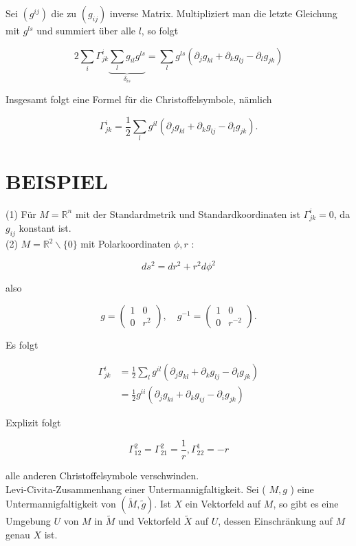 \documentclass[10pt, letterpaper]{article}
\begin{document}
Sei $\left(g^{i j}\right)$ die zu $\left(g_{i j}\right)$ inverse Matrix. Multipliziert man die letzte Gleichung mit $g^{l s}$ und summiert über alle $l$, so folgt

$$
2 \sum_{i} \Gamma_{j k}^{i} \underbrace{\sum_{l} g_{i l} g^{l s}}_{\delta_{i s}}=\sum_{l} g^{l s}\left(\partial_{j} g_{k l}+\partial_{k} g_{l j}-\partial_{l} g_{j k}\right)
$$

Insgesamt folgt eine Formel für die Christoffelsymbole, nämlich

$$
\Gamma_{j k}^{i}=\frac{1}{2} \sum_{l} g^{i l}\left(\partial_{j} g_{k l}+\partial_{k} g_{l j}-\partial_{l} g_{j k}\right) .
$$

\section*{BEISPIEL}
(1) Für $M=\mathbb{R}^{n}$ mit der Standardmetrik und Standardkoordinaten ist $\Gamma_{j k}^{i}=0$, da $g_{i j}$ konstant ist.\\
(2) $M=\mathbb{R}^{2} \backslash\{0\}$ mit Polarkoordinaten $\phi, r$ :

$$
d s^{2}=d r^{2}+r^{2} d \phi^{2}
$$

also

$$
g=\left(\begin{array}{cc}
1 & 0 \\
0 & r^{2}
\end{array}\right), \quad g^{-1}=\left(\begin{array}{cc}
1 & 0 \\
0 & r^{-2}
\end{array}\right) .
$$

Es folgt

$$
\begin{aligned}
\Gamma_{j k}^{i} & =\frac{1}{2} \sum_{l} g^{i l}\left(\partial_{j} g_{k l}+\partial_{k} g_{l j}-\partial_{l} g_{j k}\right) \\
& =\frac{1}{2} g^{i i}\left(\partial_{j} g_{k i}+\partial_{k} g_{i j}-\partial_{i} g_{j k}\right)
\end{aligned}
$$

Explizit folgt

$$
\Gamma_{12}^{2}=\Gamma_{21}^{2}=\frac{1}{r}, \Gamma_{22}^{1}=-r
$$

alle anderen Christoffelsymbole verschwinden.\\
Levi-Civita-Zusammenhang einer Untermannigfaltigkeit. Sei ( $M, g$ ) eine Untermannigfaltigkeit von $(\tilde{M}, \tilde{g})$. Ist $X$ ein Vektorfeld auf $M$, so gibt es eine Umgebung $U$ von $M$ in $\tilde{M}$ und Vektorfeld $\tilde{X}$ auf $U$, dessen Einschränkung auf $M$ genau $X$ ist.
\end{document}
